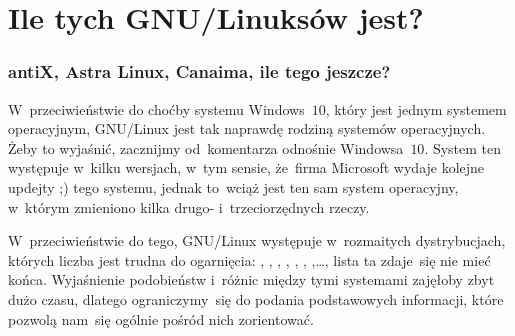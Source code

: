 \documentclass[10pt,t]{beamer}
\begin{document}
\section{Ile tych GNU/Linuksów jest?}


\begin{frame}
  \frametitle{antiX, Astra Linux, Canaima, ile tego jeszcze?}


  W~przeciwieństwie do choćby systemu Windows~$10$, który jest jednym
  systemem operacyjnym, GNU/Linux jest tak naprawdę \alert{rodziną systemów}
  operacyjnych. Żeby to wyjaśnić, zacznijmy od~komentarza odnośnie
  Windowsa~$10$. System ten występuje w~kilku wersjach, w~tym sensie,
  że~firma Microsoft wydaje kolejne updejty ;) tego systemu, jednak to~wciąż
  jest ten sam system operacyjny, w~którym zmieniono kilka drugo-
  i~trzeciorzędnych rzeczy.

  W~przeciwieństwie do tego, GNU/Linux występuje w~rozmaitych
  \alert{dystrybucjach}, których liczba jest trudna do ogarnięcia:
  ,
  ,
  ,
  ,
  ,
  ,
  ,\ldots, lista ta zdaje~się
  nie mieć końca. Wyjaśnienie podobieństw i~różnic między tymi systemami
  zajęłoby zbyt dużo czasu, dlatego ograniczymy~się do podania
  podstawowych informacji, które pozwolą nam~się ogólnie pośród nich
  zorientować.

\end{frame}
\end{document}
